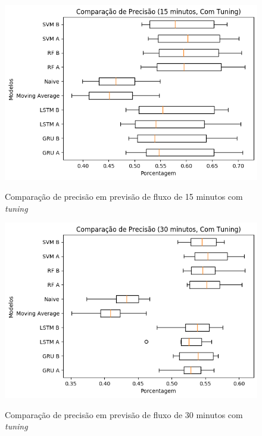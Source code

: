 \begin{figure}[htbp]
    \centering
    \includegraphics[scale=0.8]{monography/img/snapshots/comparacao_de_precisao_(15_minutos,_com_tuning)_performance_boxes.png}
    \label{figure:comparacao_previsao_precisao_15_com_tuning}
    \caption{Comparação de precisão em previsão de fluxo de 15 minutos com \textit{tuning}}
\end{figure}

\begin{figure}[htbp]
    \centering
    \includegraphics[scale=0.8]{monography/img/snapshots/comparacao_de_precisao_(30_minutos,_com_tuning)_performance_boxes.png}
    \label{figure:comparacao_previsao_precisao_30_com_tuning}
    \caption{Comparação de precisão em previsão de fluxo de 30 minutos com \textit{tuning}}
\end{figure}

